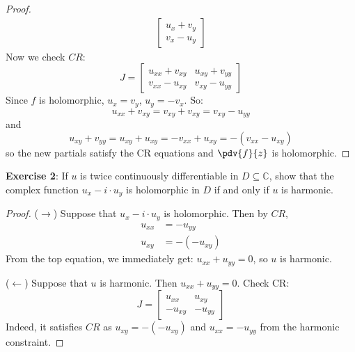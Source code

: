 \documentclass{article}
\begin{document}
\begin{proof}
\begin{align*}
\begin{bmatrix}
                               u_{x} + v_{y} \\
                               v_{x} - u_{y}   
                           \end{bmatrix}         
            \end{align*}
        Now we check $CR$:
            \begin{equation*}
                J = \begin{bmatrix}
                    u_{xx} + v_{xy} & u_{xy} + v_{yy} \\
                    v_{xx} - u_{xy} & v_{xy} - u_{yy}   
                \end{bmatrix}
            \end{equation*}
        Since $f$ is holomorphic, $u_{x} = v_{y}$, $u_{y} = -v_{x}$. So:
            \begin{equation*}
                u_{xx} + v_{xy} = v_{xy} + v_{xy} = v_{xy} - u_{yy}
            \end{equation*}
        and
            \begin{equation*}
                u_{xy} + v_{yy} = u_{xy} + u_{xy} = -v_{xx} + u_{xy} = -(v_{xx} - u_{xy})
            \end{equation*}
        so the new partials satisfy the CR equations and $\pdv{f}{z}$ is holomorphic.
    \end{proof}

\newpage

\textbf{Exercise 2}: If $u$ is twice continuously differentiable in $D \subseteq \mathbb{C}$, show that the complex function $u_{x} - i \cdot u_{y}$ is holomorphic in $D$ if and only if $u$ is harmonic.
    \begin{proof}
        ($\rightarrow$) Suppose that $u_{x} - i \cdot u_{y}$ is holomorphic. Then by $CR$, 
            \begin{align*}
                u_{xx} &= -u_{yy}    \\
                u_{xy} &= -(-u_{xy})   
            \end{align*}
        From the top equation, we immediately get: $u_{xx} + u_{yy} = 0$, so $u$ is harmonic. 

        ($\leftarrow$) Suppose that $u$ is harmonic. Then $u_{xx} + u_{yy} = 0$. Check CR:
            \begin{equation*}
                J = \begin{bmatrix}
                    u_{xx}  & u_{xy}  \\
                    -u_{xy} & -u_{yy}   
                \end{bmatrix}
            \end{equation*}
        Indeed, it satisfies $CR$ as $u_{xy} = -(-u_{xy})$ and $u_{xx} = -u_{yy}$ from the harmonic constraint.
    \end{proof}
\end{document}
